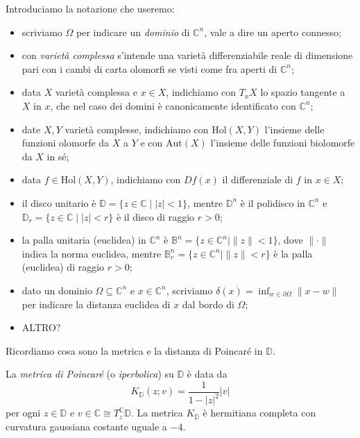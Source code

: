 Introduciamo la notazione che useremo:
\begin{itemize}
    \item scriviamo $\Omega$ per indicare un \textit{dominio} di $\mathbb{C}^n$, vale a dire un aperto connesso;
    \item con \textit{varietà complessa} s'intende una varietà differenziabile reale di dimensione pari con i cambi di carta olomorfi se visti come fra aperti di $\mathbb{C}^n$;
    \item data $X$ varietà complessa e $x \in X$, indichiamo con $T_xX$ lo spazio tangente a $X$ in $x$, che nel caso dei domini è canonicamente identificato con $\mathbb{C}^n$;
    \item date $X,Y$ varietà complesse, indichiamo con $\text{Hol}(X,Y)$ l'insieme delle funzioni olomorfe da $X$ a $Y$ e con $\text{Aut}(X)$ l'insieme delle funzioni biolomorfe da $X$ in sé;
    \item data $f \in \text{Hol}(X,Y)$, indichiamo con $Df(x)$ il differenziale di $f$ in $x \in X$;
    \item il disco unitario è $\mathbb{D}=\{z \in \mathbb{C} \mid |z|<1\}$, mentre $\mathbb{D}^n$ è il polidisco in $\mathbb{C}^n$ e $\mathbb{D}_r=\{z \in \mathbb{C} \mid |z|<r\}$ è il disco di raggio $r>0$;
    \item la palla unitaria (euclidea) in $\mathbb{C}^n$ è $\mathbb{B}^n=\{z \in \mathbb{C}^n \mid \|z\|<1\}$, dove $\|\cdot\|$ indica la norma euclidea, mentre $\mathbb{B}_r^n=\{z \in \mathbb{C}^n \mid \|z\|<r\}$ è la palla (euclidea) di raggio $r>0$;
    \item dato un dominio $\Omega\subseteq\mathbb{C}^n$ e $x \in \mathbb{C}^n$, scriviamo $\delta(x)=\displaystyle\inf_{w \in \partial\Omega}\|x-w\|$ per indicare la distanza euclidea di $x$ dal bordo di $\Omega$;
    \item ALTRO?
\end{itemize}

Ricordiamo cosa sono la metrica e la distanza di Poincaré in $\mathbb{D}$.

\begin{defn}
    La \textit{metrica di Poincaré} (o \textit{iperbolica}) su $\mathbb{D}$ è data da
    \begin{equation}
        K_{\mathbb{D}}(z;v)=\frac{1}{1-|z|^2}|v|
    \end{equation}
    per ogni $z \in \mathbb{D}$ e $v \in \mathbb{C}\cong T_z^{\mathbb{C}}\mathbb{D}$. La metrica $K_{\mathbb{D}}$ è hermitiana completa con curvatura gaussiana costante uguale a $-4$.
\end{defn}


